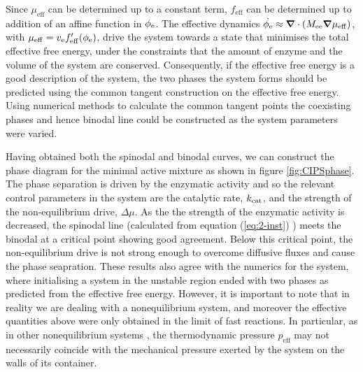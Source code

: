 Since $\mu_\mathrm{eff}$ can be determined up to a constant term, $f_\mathrm{eff}$ can be determined up to addition of an affine function in $\phi_{\mathrm{e}}$. The effective dynamics $\dot{\phi_{\mathrm{e}}}\approx \bm{\nabla} \cdot (M_{\mathrm{ee}}\bm{\nabla}\mu_\mathrm{eff})$, with $\mu_\mathrm{eff}=v_{\mathrm{e}} f'_\mathrm{eff}(\phi_{\mathrm{e}})$, drive the system towards a state that minimises the total effective free energy, under the constraints that the amount of enzyme and the volume of the system are conserved. Consequently, if the effective free energy is a good description of the system, the two phases the system forms should be predicted using the common tangent construction on the effective free energy. Using numerical methods to calculate the common tangent points \cite{wolff_thermodynamic_2011, doi_soft_2013} the coexisting phases and hence binodal line could be constructed as the system parameters were varied.

Having obtained both the spinodal and binodal curves, we can construct the phase diagram for the minimal active mixture as shown in figure \ref{fig:CIPSphase}. The phase separation is driven by the enzymatic activity and so the relevant control parameters in the system are the catalytic rate, $k_{\mathrm{cat}}$, and the strength of the non-equilibrium drive, $\Delta\mu$. As the the strength of the enzymatic activity is decreased, the spinodal line (calculated from equation (\ref{eq:2-inst}) ) meets the binodal at a critical point showing good agreement. Below this critical point, the non-equilibrium drive is not strong enough to overcome diffusive fluxes and cause the phase seapration. These results also agree with the numerics for the system, where initialising a system in the unstable region ended with two phases as predicted from the effective free energy. However, it is important to note that in reality we are dealing with a nonequilibrium system, and moreover the effective quantities above were only obtained in the limit of fast reactions. In particular, as in other nonequilibrium systems \cite{wittkowski_scalar_2014}, the thermodynamic pressure $p_\mathrm{eff}$ may not necessarily coincide with the mechanical pressure exerted by the system on the walls of its container.

